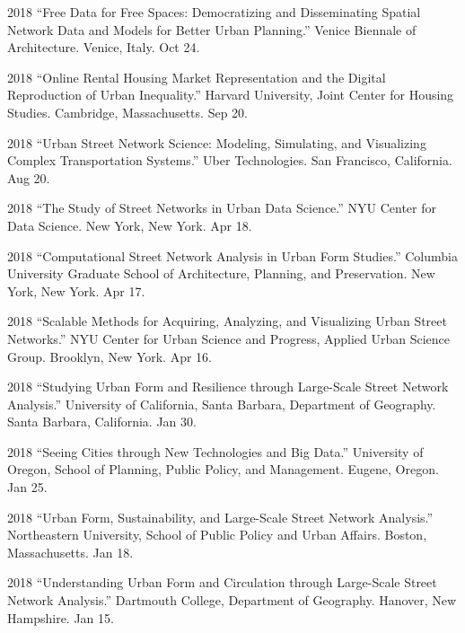 \documentclass[12pt,letterpaper]{report}
\begin{document}
\begin{tablist}
        \item[2018] \tab{}\enquote{Free Data for Free Spaces: Democratizing and Disseminating Spatial Network Data and Models for Better Urban Planning.} Venice Biennale of Architecture. Venice, Italy. Oct 24.

        \item[2018] \tab{}\enquote{Online Rental Housing Market Representation and the Digital Reproduction of Urban Inequality.} Harvard University, Joint Center for Housing Studies. Cambridge, Massachusetts. Sep 20.

        \item[2018] \tab{}\enquote{Urban Street Network Science: Modeling, Simulating, and Visualizing Complex Transportation Systems.} Uber Technologies. San Francisco, California. Aug 20.

        \item[2018] \tab{}\enquote{The Study of Street Networks in Urban Data Science.} NYU Center for Data Science. New York, New York. Apr 18.

        \item[2018] \tab{}\enquote{Computational Street Network Analysis in Urban Form Studies.} Columbia University Graduate School of Architecture, Planning, and Preservation. New York, New York. Apr 17.

        \item[2018] \tab{}\enquote{Scalable Methods for Acquiring, Analyzing, and Visualizing Urban Street Networks.} NYU Center for Urban Science and Progress, Applied Urban Science Group. Brooklyn, New York. Apr 16.

        \item[2018] \tab{}\enquote{Studying Urban Form and Resilience through Large-Scale Street Network Analysis.} University of California, Santa Barbara, Department of Geography. Santa Barbara, California. Jan 30.

        \item[2018] \tab{}\enquote{Seeing Cities through New Technologies and Big Data.} University of Oregon, School of Planning, Public Policy, and Management. Eugene, Oregon. Jan 25.

        \item[2018] \tab{}\enquote{Urban Form, Sustainability, and Large-Scale Street Network Analysis.} Northeastern University, School of Public Policy and Urban Affairs. Boston, Massachusetts. Jan 18.

        \item[2018] \tab{}\enquote{Understanding Urban Form and Circulation through Large-Scale Street Network Analysis.} Dartmouth College, Department of Geography. Hanover, New Hampshire. Jan 15.


\end{tablist}
\end{document}
